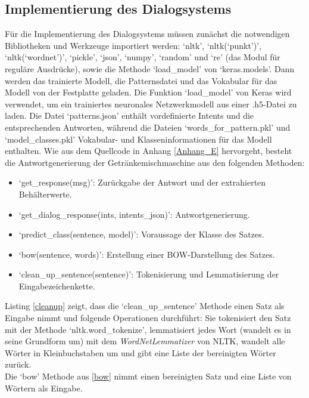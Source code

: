 \subsection{Implementierung des Dialogsystems}
Für die Implementierung des Dialogsystems müssen zunächst die notwendigen Bibliotheken und Werkzeuge importiert werden: `nltk', `nltk(`punkt')', `nltk(`wordnet')', `pickle', `json', `numpy', `random' und `re' (das Modul für reguläre Ausdrücke), sowie die Methode `load\_model' von `keras.models'.
Dann werden das trainierte Modell, die Patternsdatei und das Vokabular für das Modell von der Festplatte geladen. 
Die Funktion `load\_model' von Keras wird verwendet, um ein trainiertes neuronales Netzwerkmodell aus einer .h5-Datei zu laden. 
Die Datei `patterns.json' enthält vordefinierte Intents und die entsprechenden Antworten, während die Dateien `words\_for\_pattern.pkl' und `model\_classes.pkl' Vokabular- und Klasseninformationen für das Modell enthalten.
Wie aus dem Quellcode in Anhang \ref{Anhang_E} hervorgeht, besteht die Antwortgenerierung der Getränkemischmaschine aus den folgenden Methoden:
\begin{itemize}
    \item `get\_response(msg)': Zurückgabe der Antwort und der extrahierten Behälterwerte.
    \item `get\_dialog\_response(ints, intents\_json)': Antwortgenerierung.
    \item `predict\_class(sentence, model)': Voraussage der Klasse des Satzes.
    \item `bow(sentence, words)': Erstellung einer \ac{BOW}-Darstellung des Satzes.
    \item `clean\_up\_sentence(sentence)': Tokenisierung und Lemmatisierung der Eingabezeichenkette.
\end{itemize}

Listing \ref{cleanup} zeigt, dass die `clean\_up\_sentence' Methode einen Satz als Eingabe nimmt und folgende Operationen durchführt: 
Sie tokenisiert den Satz mit der Methode `nltk.word\_tokenize', lemmatisiert jedes Wort (wandelt es in seine Grundform um) mit dem \textit{WordNetLemmatizer} von \ac{NLTK}, wandelt alle Wörter in Kleinbuchstaben um und gibt eine Liste der bereinigten Wörter zurück.\\

Die `bow' Methode aus \ref{bow} nimmt einen bereinigten Satz und eine Liste von Wörtern als Eingabe. 
